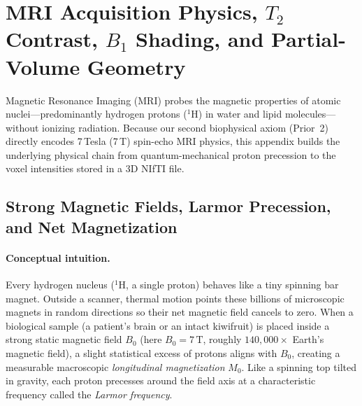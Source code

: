 \documentclass[10pt,a4paper]{article}
\renewcommand{\_}{\origunderscore\allowbreak}
\begin{document}
\clearpage
\printbibliography[heading=bibintoc,title={References}]

\clearpage
\appendix
\section[MRI Physics, $T_2$ Contrast \& Partial Volume]{MRI Acquisition Physics, $T_2$ Contrast, $B_1$ Shading, and Partial-Volume Geometry}
\label{app:mri}

Magnetic Resonance Imaging (MRI) probes the magnetic properties of atomic nuclei---predominantly hydrogen protons ($^{1}\text{H}$) in water and lipid molecules---without ionizing radiation. Because our second biophysical axiom (Prior~2) directly encodes 7\,Tesla (7\,T) spin-echo MRI physics, this appendix builds the underlying physical chain from quantum-mechanical proton precession to the voxel intensities stored in a 3D NIfTI file.

\subsection{Strong Magnetic Fields, Larmor Precession, and Net Magnetization}

\paragraph{Conceptual intuition.} Every hydrogen nucleus ($^{1}\text{H}$, a single proton) behaves like a tiny spinning bar magnet. Outside a scanner, thermal motion points these billions of microscopic magnets in random directions so their net magnetic field cancels to zero. When a biological sample (a patient's brain or an intact kiwifruit) is placed inside a strong static magnetic field $B_0$ (here $B_0 = 7\,\text{T}$, roughly $140{,}000\times$ Earth's magnetic field), a slight statistical excess of protons aligns with $B_0$, creating a measurable macroscopic \emph{longitudinal magnetization} $M_0$. Like a spinning top tilted in gravity, each proton precesses around the field axis at a characteristic frequency called the \emph{Larmor frequency}.
\end{document}
